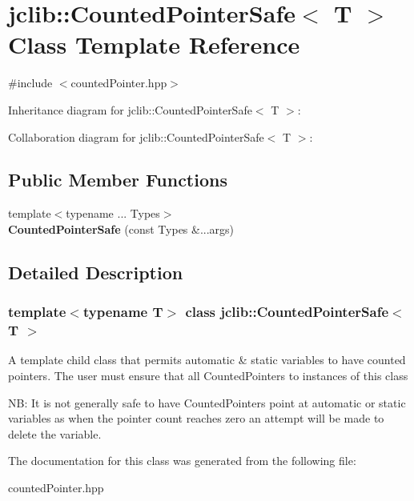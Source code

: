 \hypertarget{classjclib_1_1CountedPointerSafe}{}\section{jclib\+:\+:Counted\+Pointer\+Safe$<$ T $>$ Class Template Reference}
\label{classjclib_1_1CountedPointerSafe}


{\ttfamily \#include $<$counted\+Pointer.\+hpp$>$}



Inheritance diagram for jclib\+:\+:Counted\+Pointer\+Safe$<$ T $>$\+:


Collaboration diagram for jclib\+:\+:Counted\+Pointer\+Safe$<$ T $>$\+:
\subsection*{Public Member Functions}
\begin{DoxyCompactItemize}
\item 
\mbox{\label{classjclib_1_1CountedPointerSafe_acc5ed138b4a7b16ef407dfd0b9e0c2e5}} 
{\footnotesize template$<$typename ... Types$>$ }\\{\bfseries Counted\+Pointer\+Safe} (const Types \&...args)
\end{DoxyCompactItemize}


\subsection{Detailed Description}
\subsubsection*{template$<$typename T$>$\newline
class jclib\+::\+Counted\+Pointer\+Safe$<$ T $>$}

A template child class that permits automatic \& static variables to have counted pointers. The user must ensure that all Counted\+Pointers to instances of this class

NB\+: It is not generally safe to have Counted\+Pointers point at automatic or static variables as when the pointer count reaches zero an attempt will be made to delete the variable. 

The documentation for this class was generated from the following file\+:\begin{DoxyCompactItemize}
\item 
counted\+Pointer.\+hpp\end{DoxyCompactItemize}
